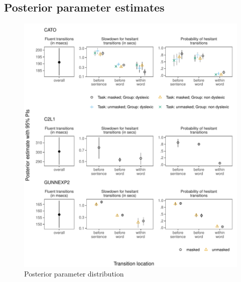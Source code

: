 \clearpage
\makeatletter
\efloat@restorefloats
\makeatother


\begin{appendix}
\section{}
\hypertarget{posterior-parameter-estimates}{%
\subsection{Posterior parameter
estimates}\label{posterior-parameter-estimates}}

\begin{figure}[!htb]
\centering
\includegraphics{figures/psplots1constr.pdf}
\caption{Posterior parameter distribution}
\end{figure}
\newpage
\begin{figure}[!htb]
\ContinuedFloat
\captionsetup{list=off,format=cont}
\centering

\end{figure}
\end{appendix}

